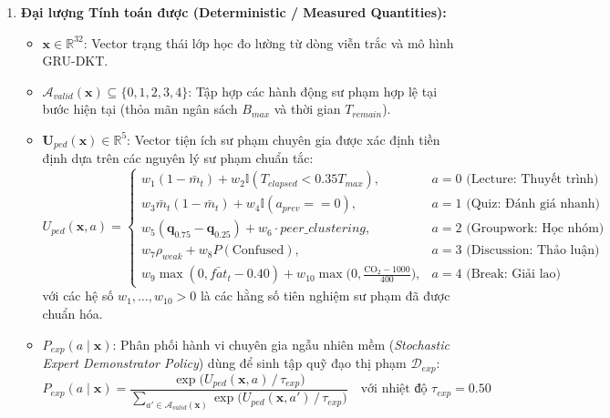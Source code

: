\begin{enumerate}[label=\textbf{(\alph*)}]
  \item \textbf{Đại lượng Tính toán được (Deterministic / Measured Quantities):}
  \begin{itemize}
    \item $\mathbf{x} \in \mathbb{R}^{32}$: Vector trạng thái lớp học đo lường từ dòng viễn trắc và mô hình GRU-DKT.
    \item $\mathcal{A}_{valid}(\mathbf{x}) \subseteq \{0, 1, 2, 3, 4\}$: Tập hợp các hành động sư phạm hợp lệ tại bước hiện tại (thỏa mãn ngân sách $B_{max}$ và thời gian $T_{remain}$).
    \item $\mathbf{U}_{ped}(\mathbf{x}) \in \mathbb{R}^5$: Vector tiện ích sư phạm chuyên gia được xác định tiền định dựa trên các nguyên lý sư phạm chuẩn tắc:
    \begin{equation}\label{eq:pedagogical-utility}
      U_{ped}(\mathbf{x}, a) = \begin{cases}
        w_1 (1 - \bar{m}_t) + w_2 \mathbb{I}(T_{elapsed} < 0.35 T_{max}), & a = 0 \text{ (Lecture: Thuyết trình)} \\
        w_3 \bar{m}_t (1 - \bar{m}_t) + w_4 \mathbb{I}(a_{prev} == 0), & a = 1 \text{ (Quiz: Đánh giá nhanh)} \\
        w_5 (\mathbf{q}_{0.75} - \mathbf{q}_{0.25}) + w_6 \cdot peer\_clustering, & a = 2 \text{ (Groupwork: Học nhóm)} \\
        w_7 \rho_{weak} + w_8 P(\text{Confused}), & a = 3 \text{ (Discussion: Thảo luận)} \\
        w_9 \max(0, \bar{fat}_t - 0.40) + w_{10} \max\big(0, \frac{\text{CO}_2 - 1000}{400}\big), & a = 4 \text{ (Break: Giải lao)}
      \end{cases}
    \end{equation}
    với các hệ số $w_1, \dots, w_{10} > 0$ là các hằng số tiên nghiệm sư phạm đã được chuẩn hóa.
    \item $P_{exp}(a \mid \mathbf{x})$: Phân phối hành vi chuyên gia ngẫu nhiên mềm (\textit{Stochastic Expert Demonstrator Policy}) dùng để sinh tập quỹ đạo thị phạm $\mathcal{D}_{exp}$:
    \begin{equation}\label{eq:irl-expert-utility}
      P_{exp}(a \mid \mathbf{x}) = \frac{\exp\big(U_{ped}(\mathbf{x}, a) \,/\, \tau_{exp}\big)}{\sum_{a' \in \mathcal{A}_{valid}(\mathbf{x})} \exp\big(U_{ped}(\mathbf{x}, a') \,/\, \tau_{exp}\big)} \quad \text{với nhiệt độ } \tau_{exp} = 0.50
    \end{equation}
  \end{itemize}


\end{enumerate}
